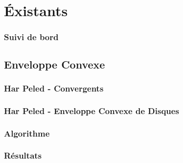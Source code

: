 \section{Éxistants}

\begin{frame}
\frametitle{Suivi de bord}

\end{frame}

\subsection{Enveloppe Convexe}

\begin{frame}
\frametitle{Har Peled - Convergents}

\end{frame}



\begin{frame}
\frametitle{Har Peled - Enveloppe Convexe de Disques}

\end{frame}

\begin{frame}
\frametitle{Algorithme}

\end{frame}

\begin{frame}
\frametitle{Résultats}

\end{frame}
